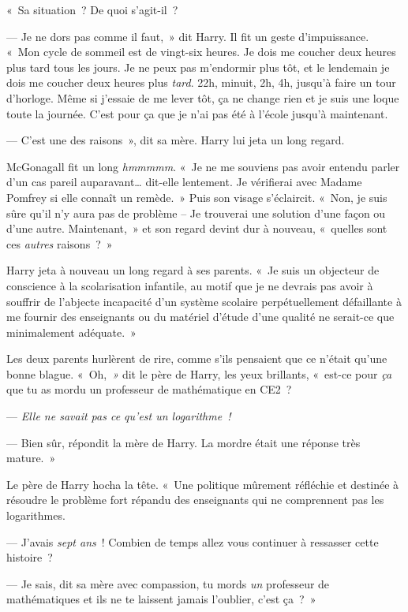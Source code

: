 «~Sa situation~? De quoi s'agit-il~?

--- Je ne dors pas comme il faut,~» dit Harry. Il fit un geste d'impuissance. «~Mon cycle de sommeil est de vingt-six heures. Je dois me coucher deux heures plus tard tous les jours. Je ne peux pas m'endormir plus tôt, et le lendemain je dois me coucher deux heures plus \emph{tard}. 22h, minuit, 2h, 4h, jusqu'à faire un tour d'horloge. Même si j'essaie de me lever tôt, ça ne change rien et je suis une loque toute la journée. C'est pour ça que je n'ai pas été à l'école jusqu'à maintenant.

--- C'est une des raisons~», dit sa mère. Harry lui jeta un long regard.

McGonagall fit un long \emph{hmmmmm}. «~Je ne me souviens pas avoir entendu parler d'un cas pareil auparavant… dit-elle lentement. Je vérifierai avec Madame Pomfrey si elle connaît un remède.~» Puis son visage s'éclaircit. «~Non, je suis sûre qu'il n'y aura pas de problème -- Je trouverai une solution d'une façon ou d'une autre. Maintenant,~» et son regard devint dur à nouveau, «~quelles sont ces \emph{autres} raisons~?~»

Harry jeta à nouveau un long regard à ses parents. «~Je suis un objecteur de conscience à la scolarisation infantile, au motif que je ne devrais pas avoir à souffrir de l'abjecte incapacité d'un système scolaire perpétuellement défaillante à me fournir des enseignants ou du matériel d'étude d'une qualité ne serait-ce que minimalement adéquate.~»

Les deux parents hurlèrent de rire, comme s'ils pensaient que ce n'était qu'une bonne blague. «~Oh,\emph{~»} dit le père de Harry, les yeux brillants, «~est-ce pour \emph{ça} que tu as mordu un professeur de mathématique en CE2~?

--- \emph{Elle ne savait pas ce qu'est un logarithme~!}

--- Bien sûr, répondit la mère de Harry. La mordre était une réponse très mature.~»

Le père de Harry hocha la tête. «~Une politique mûrement réfléchie et destinée à résoudre le problème fort répandu des enseignants qui ne comprennent pas les logarithmes.

--- J'avais \emph{sept ans}~! Combien de temps allez vous continuer à ressasser cette histoire~?

--- Je sais, dit sa mère avec compassion, tu mords \emph{un} professeur de mathématiques et ils ne te laissent jamais l'oublier, c'est ça~?~»

